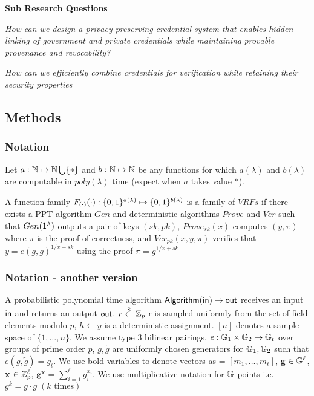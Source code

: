 \noindent \textbf{Sub Research Questions}

\textit{How can we design a privacy-preserving credential system that enables hidden linking of government and private credentials while maintaining provable provenance and revocability?}

\textit{How can we efficiently combine credentials for verification while retaining their security properties}


\subsection{Methods}

\subsubsection{Notation}
Let $a : \mathbb{N} \mapsto \mathbb{N} \bigcup \{*\}$ and $b : \mathbb{N} \mapsto \mathbb{N}$ be any functions for which $a(\lambda)$ and $b(\lambda)$ are computable in $poly(\lambda)$ time (expect when $a$ takes value $*$).
\begin{definition}
    A function family $F_{(\cdot)}(\cdot) : \{0,1\}^{a(\lambda)} \mapsto \{0,1\}^{b(\lambda)}$ is a family of $VRFs$ if there exists a PPT algorithm $Gen$ and deterministic algorithms $Prove$ and $Ver$ such that $Gen(\mathsf{1^{\lambda}})$ outputs a pair of keys $(sk, pk)$, $Prove_{sk}(x)$ computes $(y, \pi)$ where $\pi$ is the proof of correctness, and $Ver_{pk}(x,y,\pi)$ verifies that $y = e(g,g)^{1/x+sk}$ using the proof $\pi = g^{1/x+sk}$
\end{definition}

\subsubsection{Notation - another version}
A probabilistic polynomial time algorithm $\mathsf{Algorithm}(\mathsf{in}) \rightarrow \mathsf{out}$ receives an input $\mathsf{in}$ and returns an output $\mathsf{out}$. $r \stackrel{\$}{\gets} \mathbb{Z}_p$ r is sampled uniformly from the set of field elements modulo $p$,  $h \gets y$ is a deterministic assignment. $[n]$ denotes a sample space of $\{1,\dots,n\}$. We assume type 3 bilinear pairings, $e: \mathbb{G}_1 \times \mathbb{G}_2 \to \mathbb{G}_t$ over groups of prime order $p$, $g, \tilde{g}$ are uniformly chosen generators for $\mathbb{G}_1, \mathbb{G}_2$ such that $e(g, \tilde{g}) = g_t$. We use bold variables to denote vectors as  = $[m_1, \dots, m_{\ell}]$, \textbf{g} $\in \mathbb{G}^{\ell}$, \textbf{x} $\in \mathbb{Z}_p^{\ell}$, $\textbf{g}^{\textbf{x}}$ = $\sum\nolimits_{i=1}^\ell g_i^{x_i}$. We use multiplicative notation for $\mathbb{G}$ points i.e. $g^k = g \cdot g \;  (k \text{ times})$

